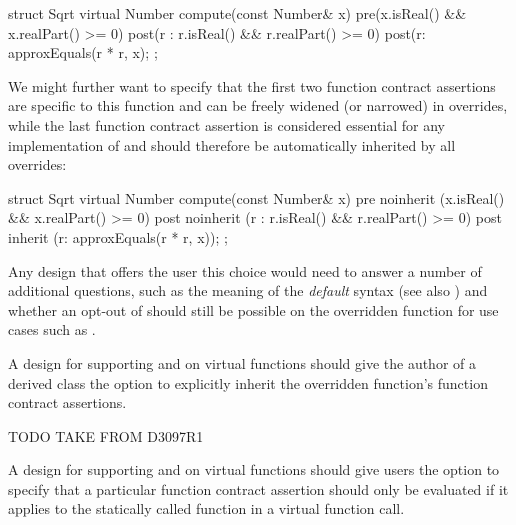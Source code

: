 \begin{codeblock}
struct Sqrt {
  virtual Number compute(const Number& x)
    pre(x.isReal() && x.realPart() >= 0)
    post(r : r.isReal() && r.realPart() >= 0)
    post(r: approxEquals(r * r, x);
};
\end{codeblock}

We might further want to specify that the first two function contract assertions are specific to this function and can be freely widened (or narrowed) in overrides, while the last function contract assertion is considered essential for any implementation of  and should therefore be automatically inherited by all overrides:

\begin{codeblock}
struct Sqrt {
  virtual Number compute(const Number& x)
    pre noinherit (x.isReal() && x.realPart() >= 0)
    post noinherit (r : r.isReal() && r.realPart() >= 0)
    post inherit (r: approxEquals(r * r, x));
};
\end{codeblock}

Any design that offers the user this choice would need to answer a number of additional questions, such as the meaning of the \emph{default} syntax (see also ) and whether an opt-out of  should still be possible on the overridden function for use cases such as .


A design for supporting  and  on virtual functions should give the author of a derived class the option to explicitly inherit the overridden function's function contract assertions.



TODO TAKE FROM D3097R1


A design for supporting  and  on virtual functions should give users the option to specify that a particular function contract assertion should only be evaluated if it applies to the statically called function in a virtual function call.

